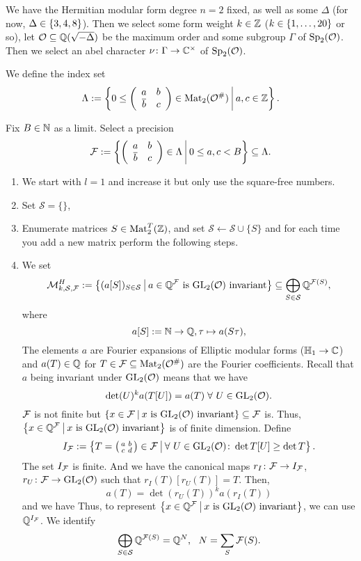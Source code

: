 \begin{algo}
We have the Hermitian modular form degree $n = 2$ fixed, as well as some $\Delta$ (for now, $\Delta \in \Set{3,4,8}$). Then we select some form weight $k \in \mathbb{Z}$ ($k \in \Set{1,\dots,20}$ or so), let $\mathcal{O} \subseteq \mathbb{Q}(\sqrt{-\Delta})$ be the maximum order and some subgroup $\Gamma$ of $\operatorname{Sp}_2(\mathcal{O})$. Then we select an abel character $\nu \colon \Gamma \rightarrow \mathbb{C}^\times$ of $\operatorname{Sp}_2(\mathcal{O})$.

We define the index set
\[ \Lambda := \Set{0 \le \SimpleMatrix{a}{b}{\overline b}{c} \in \M_2(\curlO^\#)}{a,c \in \Z } . \]

Fix $B \in \mathbb{N}$ as a limit. Select a precision
\[ \F := \Set{\SimpleMatrix{a}{b}{\overline b}{c} \in \Lambda}{0 \le a , c < B} \subseteq \Lambda . \]

\begin{enumerate}
\item We start with $l = 1$ and increase it but only use the square-free numbers.
\item Set $\mathcal{S} = \{\}$,
\item\label{NextSStep} Enumerate matrices $S \in \operatorname{Mat}_2^T(\mathbb{Z})$, and set $\mathcal{S} \leftarrow \mathcal{S} \cup \{ S \}$ and for each time you add a new matrix perform the following steps.


\item We set
\[ \mathcal{M}_{k,\mathcal{S},\F}^H := \Set{ (a [S])_{S\in\mathcal{S}} }{\text{$a \in \Q^\F$ is $\GL_2(\curlO)$ invariant}} \subseteq \bigoplus_{S\in\mathcal{S}} \Q^{\F(S)} , \]
where
\[ a[S] := \mathbb{N} \rightarrow \mathbb{Q}, \tau \mapsto a(S \tau), \]
The elements $a$ are Fourier expansions of Elliptic modular forms ($\mathbb{H}_1 \rightarrow \mathbb{C}$) and $a(T) \in \mathbb{Q}$ for $T \in \mathcal{F} \subseteq \operatorname{Mat}_2(\mathcal{O}^\#)$ are the Fourier coefficients.
Recall that $a$ being invariant under $\operatorname{GL}_2(\mathcal{O})$ means that we have
\[ \det(U)^k a(T[U]) = a(T) \; \forall\ U \in \operatorname{GL}_2(\mathcal{O}) . \]
$\mathcal{F}$ is not finite but $\invar{\F}{\GL_2(\curlO)} \subseteq \F$ is.
Thus, $\invar{\Q^\F}{\GL_2(\curlO)}$ is of finite dimension.
Define
\[ I_\F := \Set{T =\SmallMatrix{a}{b}{c}{d} \in \F}{\forall\ U \in \GL_2(\curlO) \colon \det{T[U]} \ge \det{T}} . \]
The set $I_{\mathcal{F}}$ is finite. And we have the canonical maps $r_I \colon \mathcal{F} \rightarrow I_{\mathcal{F}}$, $r_U \colon \mathcal{F} \rightarrow \operatorname{GL}_2(\mathcal{O})$ such that $r_I(T) [r_U(T)] = T$. Then,
\[ a(T) =  \det(r_U(T))^k a(r_I(T)) \]
and we have 
Thus, to represent $\invar{\Q^\F}{\GL_2(\curlO)}$, we can use $\mathbb{Q}^{I_{\mathcal{F}}}$.
We identify
\[ \bigoplus_{S\in\mathcal{S}} \Q^{\F(S)} = \Q^N, \ \ N = \sum_S \F(S) . \]


\end{enumerate}
\end{algo}

